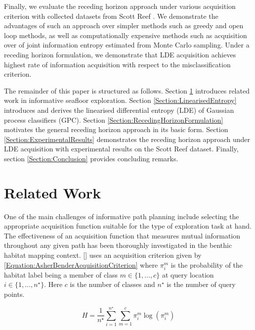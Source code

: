 \documentclass{article}
\newcommand{\incite}[1]{\citeauthor{#1} [\citeyear{#1}]}
\begin{document}
	Finally, we evaluate the receding horizon approach under various acquisition criterion with collected datasets from Scott Reef \cite{IMOS}. We demonstrate the advantages of such an approach over simpler methods such as greedy and open loop methods, as well as computationally expensive methods such as acquisition over of joint information entropy estimated from Monte Carlo sampling.  Under a receding horizon formulation, we demonstrate that LDE acquisition achieves highest rate of information acquisition with respect to the misclassification criterion.
	
	The remainder of this paper is structured as follows. Section \ref{Section:RelatedWork} introduces related work in informative seafloor exploration. Section \ref{Section:LinearisedEntropy} introduces and derives the linearised differential entropy (LDE) of Gaussian process classifiers (GPC). Section \ref{Section:RecedingHorizonFormulation} motivates the general receding horizon approach in its basic form. Section \ref{Section:ExperimentalResults} demonstrates the receding horizon approach under LDE acquisition with experimental results on the Scott Reef dataset. Finally, section \ref{Section:Conclusion} provides concluding remarks.
	
\section{Related Work}
\label{Section:RelatedWork}

	One of the main challenges of informative path planning include selecting the appropriate acquisition function suitable for the type of exploration task at hand. The effectiveness of an acquisition function that measures mutual information throughout any given path has been thoroughly investigated in the benthic habitat mapping context. \incite{AsherBender} uses an acquisition criterion given by \eqref{Equation:AsherBenderAcquisitionCriterion} where $\pi^{m}_{i}$ is the probability of the habitat label being a member of class $m \in \{1, \dots, c\}$ at query location $i \in \{1, \dots, n^{\star}\}$. Here $c$ is the number of classes and $n^{\star}$ is the number of query points.
	
	\begin{equation}
		H = \frac{1}{n^{\star}} \sum_{i = 1}^{n^{\star}} \sum_{m = 1}^{c} \pi^{m}_{i} \log(\pi^{m}_{i})
	\label{Equation:AsherBenderAcquisitionCriterion}
	\end{equation}
	
\end{document}
